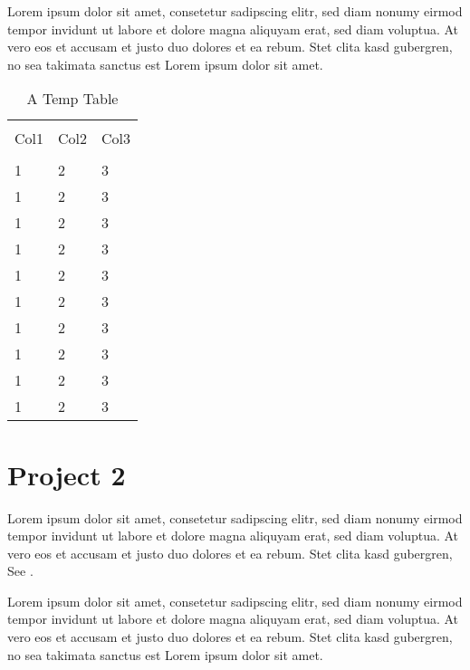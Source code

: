 \documentclass[main.tex]{subfile}
\begin{document}
Lorem ipsum dolor sit amet, consetetur sadipscing elitr, sed diam nonumy eirmod
tempor invidunt ut labore et dolore magna aliquyam erat, sed diam voluptua. At
vero eos et accusam et justo duo dolores et ea rebum. Stet clita kasd gubergren,
no sea takimata sanctus est Lorem ipsum dolor sit amet.

\begin{table}[h]
	\begin{tabularx}{\textwidth}{lll}
		\toprule
		\\Col1 & Col2 & Col3
		\\\midrule
		\\1 & 2 & 3
		\\1 & 2 & 3
		\\1 & 2 & 3
		\\1 & 2 & 3
		\\1 & 2 & 3
		\\1 & 2 & 3
		\\1 & 2 & 3
		\\1 & 2 & 3
		\\1 & 2 & 3
		\\1 & 2 & 3
		\\\bottomrule
	\end{tabularx}
	\caption{A Temp Table}
	\label{tab:projTable}
\end{table}

\section{Project 2} 
\label{sec:project_2}

Lorem ipsum dolor sit amet, consetetur sadipscing elitr, sed diam nonumy eirmod
tempor invidunt ut labore et dolore magna aliquyam erat, sed diam voluptua. At
vero eos et accusam et justo duo dolores et ea rebum. Stet clita kasd gubergren,
See .

Lorem ipsum dolor sit amet, consetetur sadipscing elitr, sed diam nonumy eirmod
tempor invidunt ut labore et dolore magna aliquyam erat, sed diam voluptua. At
vero eos et accusam et justo duo dolores et ea rebum. Stet clita kasd gubergren,
no sea takimata sanctus est Lorem ipsum dolor sit amet.

%

\end{document}
